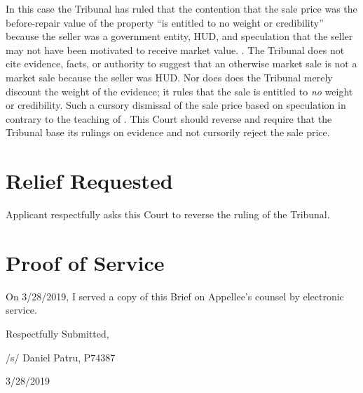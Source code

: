 \documentclass[12pt,\documentclassflag]{michiganCourtOfAppealsBrief}
\begin{document}
In this case the Tribunal has ruled that the contention that the sale price was the before-repair value of the property ``is entitled to no weight or credibility'' because the seller was a government entity, HUD, and speculation that the seller may not have been motivated to receive market value. \reconsiderationDenied[2]. The Tribunal does not cite evidence, facts, or authority to suggest that an otherwise market sale is not a market sale because the seller was HUD. Nor does does the Tribunal merely discount the weight of the evidence; it rules that the sale is entitled to {\em no} weight or credibility. Such a cursory dismissal of the sale price based on speculation in contrary to the teaching of \cite[s]{Jones & Laughlin}. This Court should reverse and require that the Tribunal base its rulings on evidence and not cursorily reject the sale price. 

\section{Relief Requested}

Applicant respectfully asks this Court to reverse the ruling of the Tribunal. 

\section{Proof of Service}

On 3/28/2019, I served a copy of this Brief on Appellee's counsel by electronic service.

\vspace{1\baselineskip}

{ \setlength{\leftskip}{3.5in}

  Respectfully Submitted,

  /s/ Daniel Patru, P74387

  3/28/2019

  \setlength{\leftskip}{0pt}}

\newpage\empty%
\end{document}

